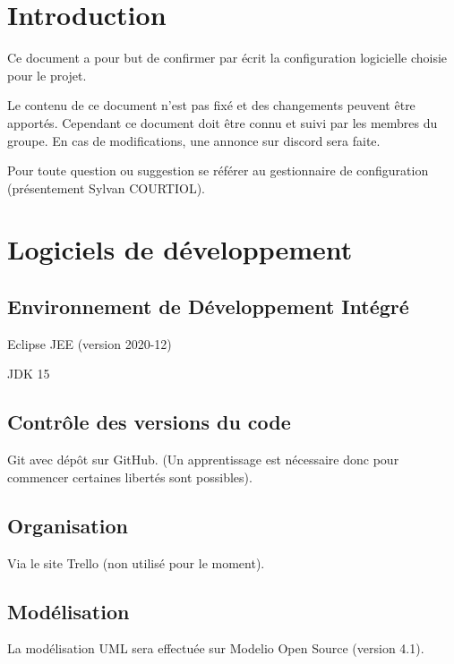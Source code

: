 \documentclass[11pt,a4paper,titlepage,openright]{report}
\begin{document}
    \renewcommand{\contentsname}{Sommaire}
    \tableofcontents
    
    \newpage

    \setcounter{section}{0}
    \renewcommand{\thesection}{\arabic{section}} 
    \renewcommand{\thesubsection}{\arabic{section}.\arabic{subsection}}
    
    
    \section*{Introduction}
    \Large
    Ce document a pour but de confirmer par écrit la configuration logicielle choisie pour le
    projet.
    \par Le contenu de ce document n’est pas fixé et des changements peuvent être apportés. Cependant ce document doit être connu et suivi par les membres du groupe. En cas de modifications, une annonce sur discord sera faite.
    \par Pour toute question ou suggestion se référer au gestionnaire de configuration (présentement
    Sylvan COURTIOL).


    \normalsize
    \section{Logiciels de développement}
        \subsection{Environnement de Développement Intégré}
        Eclipse JEE (version 2020-12)
        \par JDK 15
        
        \subsection{Contrôle des versions du code}
        Git avec dépôt sur GitHub. (Un apprentissage est nécessaire
        donc pour commencer certaines libertés sont possibles).
        
        \subsection{Organisation}
        Via le site Trello (non utilisé pour le moment).
        
        \subsection{Modélisation}
        La modélisation UML sera effectuée sur Modelio Open Source (version 4.1).
        
\end{document}
